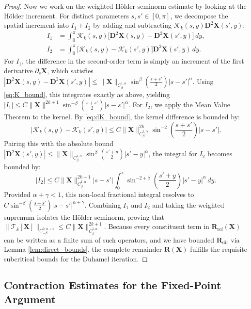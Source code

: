 \documentclass{amsart}
\begin{document}
\begin{proof}
Now we work on the weighted H\"older seminorm estimate by looking at the  H\"older increment.
For distinct parameters $s, s' \in [0,\pi]$, we decompose the spatial increment into $I_1 + I_2$ by adding and subtracting $\mathcal{K}_k(s,y) \mathbf{D}^2\mathbf{X}(s',y)$:
\begin{align*}
I_1 &= \int_0^\pi \mathcal{K}_k(s,y) \big[ \mathbf{D}^2\mathbf{X}(s,y) - \mathbf{D}^2\mathbf{X}(s',y) \big] \, dy, \\
I_2 &= \int_0^\pi \big[ \mathcal{K}_k(s,y) - \mathcal{K}_k(s',y) \big] \mathbf{D}^2\mathbf{X}(s',y) \, dy.
\end{align*}
For $I_1$, the difference in the second-order term is simply an increment of the first derivative $\partial_s \mathbf{X}$, which satisfies $|\mathbf{D}^2\mathbf{X}(s,y) - \mathbf{D}^2\mathbf{X}(s',y)| \le \|\mathbf{X}\|_{C^{1,\alpha}_\beta} \sin^\beta(\frac{s+s'}{2}) |s-s'|^\alpha$. Using \eqref{eq:K_bound}, this integrates exactly as above, yielding $|I_1| \le C \|\mathbf{X}\|^{2k+1} \sin^{-\beta}(\frac{s+s'}{2}) |s-s'|^\alpha$.
For $I_2$, we apply the Mean Value Theorem to the kernel. By \eqref{eq:dK_bound}, the kernel difference is bounded by:
\[
|\mathcal{K}_k(s,y) - \mathcal{K}_k(s',y)| \le C \|\mathbf{X}\|^{2k}_{C^{1,\alpha}_\beta} \sin^{-2}\left(\frac{s+s'}{2}\right) |s-s'|.
\]
Pairing this with the absolute bound $|\mathbf{D}^2\mathbf{X}(s',y)| \le \|\mathbf{X}\|_{C^{1,\alpha}_\beta} \sin^\beta(\frac{s'+y}{2}) |s'-y|^\alpha$, the integral for $I_2$ becomes bounded by:
\[
|I_2| \le C \|\mathbf{X}\|^{2k+1}_{C^{1,\alpha}_\beta} |s-s'| \int_0^\pi \sin^{-2+\beta}\left(\frac{s'+y}{2}\right) |s'-y|^\alpha \, dy.
\]
Provided $\alpha + \gamma < 1$, this non-local fractional integral resolves to $C \sin^{-\beta}(\frac{s+s'}{2}) |s-s'|^{\alpha+\gamma}$.
Combining $I_1$ and $I_2$ and taking the weighted supremum isolates the Hölder seminorm, proving that $\|\mathcal{T}_k[\mathbf{X}]\|_{C^{0,\alpha+\gamma}_{-\beta}} \le C \|\mathbf{X}\|_{C^{1,\alpha}_\beta}^{2k+1}$. Because every constituent term in $\mathbf{R}_{\mathrm{ref}}(\mathbf{X})$ can be written as a finite sum of such operators, and we have bounded $\mathbf{R}_{\mathrm{dir}}$ via Lemma \ref{lem:direct_bounds}, the complete remainder $\mathbf{R}(\mathbf{X})$ fulfills the requisite subcritical bounds for the Duhamel iteration.
\end{proof}

\subsection{Contraction Estimates for the Fixed-Point Argument}
\end{document}
